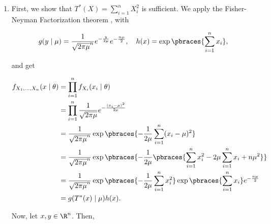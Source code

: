 \begin{solution}

\phantom{}

\begin{enumerate}[label = (\alph*)]

    \item First, we show that $T^\ast(X) = \sum_{i=1}^n X_i^2$ is sufficient.
    We apply the Fisher-Neyman Factorization theorem \cite[lecture 8, slide 13]{EStat}, with

    \begin{align*}
        g(y \mid \mu) = \frac{1}{\sqrt{2 \pi \mu}^n} e^{-\frac{y}{2 \mu}} e^{-\frac{n \mu}{2}},
        \quad
        h(x) = \exp \pbraces{\sum_{i=1}^n x_i},
    \end{align*}

    and get

    \begin{align*}
        f_{X_1, \dots, X_n}(x \mid \theta)
        & =
        \prod_{i=1}^n
            f_{X_i}(x_i \mid \theta) \\
        & =
        \prod_{i=1}^n
            \frac{1}{\sqrt{2 \pi \mu}}
            e^{-\frac{(x_i - \mu)^2}{2 \mu}} \\
        & =
        \frac{1}{\sqrt{2 \pi \mu}^n}
        \exp
        \pbraces
        {
            -\frac{1}{2 \mu}
            \sum_{i=1}^n
                (x_i - \mu)^2
        } \\
        & =
        \frac{1}{\sqrt{2 \pi \mu}^n}
        \exp
        \pbraces
        {
            -\frac{1}{2 \mu}
            \pbraces
            {
                \sum_{i=1}^n
                    x_i^2
                -
                2 \mu
                \sum_{i=1}^n
                    x_i
                +
                n \mu^2
            }
        } \\
        & =
        \frac{1}{\sqrt{2 \pi \mu}^n}
        \exp
        \pbraces
        {
            -\frac{1}{2 \mu}
            \sum_{i=1}^n
                x_i^2
        }
        \exp \pbraces{\sum_{i=1}^n x_i}
        e^{-\frac{n \mu}{2}} \\
        & =
        g(T^\ast(x) \mid \mu) h(x).
    \end{align*}

    Now, let $x, y \in \R^n$.
    Then,


\end{enumerate}
\end{solution}
